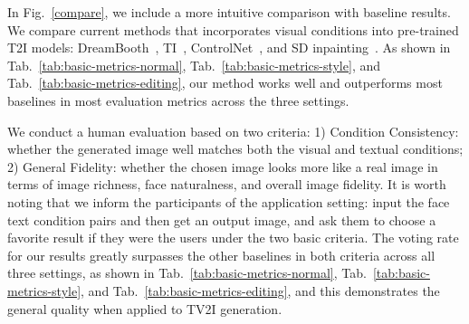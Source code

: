 

In Fig.~\ref{compare}, we include a more intuitive comparison with baseline results.
We compare current methods that incorporates visual conditions into pre-trained T2I models: DreamBooth~\cite{ruiz2022dreambooth}, TI~\cite{gal2022ti}, ControlNet~\cite{controlnet}, and SD inpainting~\cite{rombach2022ldm}. As shown in Tab.~\ref{tab:basic-metrics-normal}, Tab.~\ref{tab:basic-metrics-style}, and Tab.~\ref{tab:basic-metrics-editing}, our method works well and outperforms most baselines in most evaluation metrics across the three settings.

We conduct a human evaluation based on two criteria: 1) {Condition Consistency}: whether the generated image well matches both the visual and textual conditions; 2) {General Fidelity}: whether the chosen image looks more like a real image in terms of image richness, face naturalness, and overall image fidelity.  It is worth noting that we inform the participants of the application setting: input the face text condition pairs and then get an output image, and ask them to choose a favorite result if they were the users under the two basic criteria. The voting rate for our results greatly surpasses the other baselines in both criteria across all three settings, as shown in Tab.~\ref{tab:basic-metrics-normal}, Tab.~\ref{tab:basic-metrics-style}, and Tab.~\ref{tab:basic-metrics-editing}, and this demonstrates the general quality when applied to TV2I generation. 

